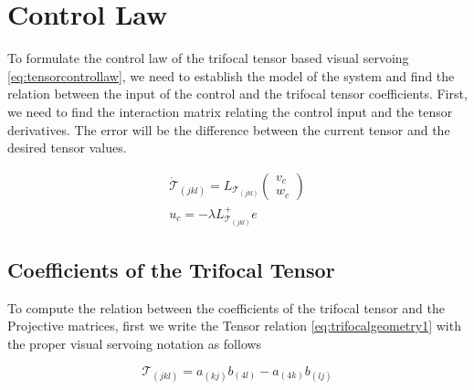 \section{Control Law}
To formulate the control law of the trifocal tensor based visual servoing \eqref{eq:tensorcontrollaw}, we need to establish the model of the system and find the relation between the input of the control and the trifocal tensor coefficients. First, we need to find the interaction matrix relating the control input and the tensor derivatives. The error will be the difference between the current tensor and the desired tensor values.

\begin{equation}
  \begin{gathered}
  \dot{\mathcal{T}}_{(jkl)} = L_{\mathcal{T}_{(jkl)}} \begin{pmatrix} v_c \\ w_c \end{pmatrix}\\
  u_c = -\lambda L_{\mathcal{T}_{(jkl)}}^{+} e
\end{gathered} \label{eq:tensorcontrollaw}
\end{equation}

\subsection{Coefficients of the Trifocal Tensor}
To compute the relation between the coefficients of the trifocal tensor and the Projective matrices, first we write the Tensor relation \eqref{eq:trifocalgeometry1} with the proper visual servoing notation as follows

\begin{equation}
  \mathcal{T}_{(jkl)} = a_{(kj)}b_{(4l)} - a_{(4k)}b_{(lj)} \label{eq:tensorrelation}
\end{equation}

